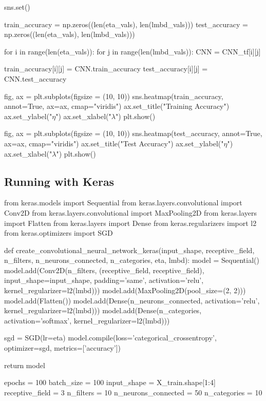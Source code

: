 \documentclass[%
oneside,                 %
final,                   %
10pt]{article}
\begin{document}
sns.set()

train_accuracy = np.zeros((len(eta_vals), len(lmbd_vals)))
test_accuracy = np.zeros((len(eta_vals), len(lmbd_vals)))

for i in range(len(eta_vals)):
    for j in range(len(lmbd_vals)):
        CNN = CNN_tf[i][j]

        train_accuracy[i][j] = CNN.train_accuracy
        test_accuracy[i][j] = CNN.test_accuracy

        
fig, ax = plt.subplots(figsize = (10, 10))
sns.heatmap(train_accuracy, annot=True, ax=ax, cmap="viridis")
ax.set_title("Training Accuracy")
ax.set_ylabel("$\eta$")
ax.set_xlabel("$\lambda$")
plt.show()

fig, ax = plt.subplots(figsize = (10, 10))
sns.heatmap(test_accuracy, annot=True, ax=ax, cmap="viridis")
ax.set_title("Test Accuracy")
ax.set_ylabel("$\eta$")
ax.set_xlabel("$\lambda$")
plt.show()
\epycod

\subsection{Running with Keras}

\bpycod
from keras.models import Sequential
from keras.layers.convolutional import Conv2D
from keras.layers.convolutional import MaxPooling2D
from keras.layers import Flatten
from keras.layers import Dense
from keras.regularizers import l2
from keras.optimizers import SGD

def create_convolutional_neural_network_keras(input_shape, receptive_field,
                                              n_filters, n_neurons_connected, n_categories,
                                              eta, lmbd):
    model = Sequential()
    model.add(Conv2D(n_filters, (receptive_field, receptive_field), input_shape=input_shape, padding='same',
              activation='relu', kernel_regularizer=l2(lmbd)))
    model.add(MaxPooling2D(pool_size=(2, 2)))
    model.add(Flatten())
    model.add(Dense(n_neurons_connected, activation='relu', kernel_regularizer=l2(lmbd)))
    model.add(Dense(n_categories, activation='softmax', kernel_regularizer=l2(lmbd)))
    
    sgd = SGD(lr=eta)
    model.compile(loss='categorical_crossentropy', optimizer=sgd, metrics=['accuracy'])
    
    return model

epochs = 100
batch_size = 100
input_shape = X_train.shape[1:4]
receptive_field = 3
n_filters = 10
n_neurons_connected = 50
n_categories = 10
\end{document}
